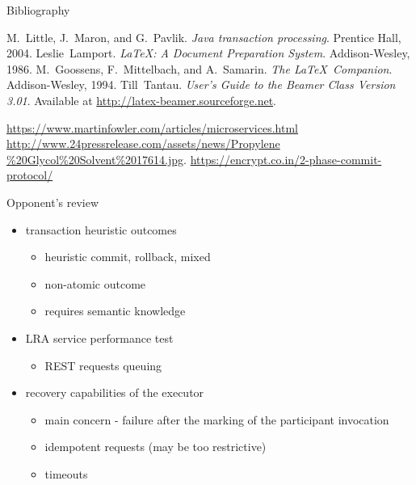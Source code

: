 \documentclass{beamer}
\begin{document}
\begin{frame}[label=bibliography]{Bibliography}
    \begin{thebibliography}{9}
        M.~Little, J.~Maron, and G.~Pavlik.
        \emph{Java transaction processing}.
        Prentice Hall, 2004.
        Leslie~Lamport.
        \emph{\LaTeX : A Document Preparation System}.
        Addison-Wesley, 1986.
        M.~Goossens, F.~Mittelbach, and A.~Samarin.
        \emph{The \LaTeX\ Companion}.
        Addison-Wesley, 1994.
        Till~Tantau.
        \emph{User's Guide to the Beamer Class Version 3.01}.
        Available at \url{http://latex-beamer.sourceforge.net}.

        \small
        \href{https://www.martinfowler.com/articles/microservices.html}{https://www.martinfowler.com/articles/microservices.html}
        \href{http://www.24pressrelease.com/assets/news/Propylene\%20Glycol\%20Solvent\%2017614.jpg}{http://www.24pressrelease.com/assets/news/Propylene\\\%20Glycol\%20Solvent\%2017614.jpg}.
        \href{https://encrypt.co.in/2-phase-commit-protocol/}{https://encrypt.co.in/2-phase-commit-protocol/}
    \end{thebibliography}


\end{frame}

\begin{frame}{Opponent's review}
    \Large
    \begin{itemize}
        \item transaction heuristic outcomes
        \begin{itemize}
            \item heuristic commit, rollback, mixed
            \item non-atomic outcome
            \item requires semantic knowledge
        \end{itemize}
        \item LRA service performance test
        \begin{itemize}
            \item REST requests queuing 
        \end{itemize}
        \item recovery capabilities of the executor
        \begin{itemize}
            \item main concern - failure after the marking of the participant invocation
            \item idempotent requests (may be too restrictive)
            \item timeouts
        \end{itemize}
    \end{itemize}
\end{frame}
\end{document}
